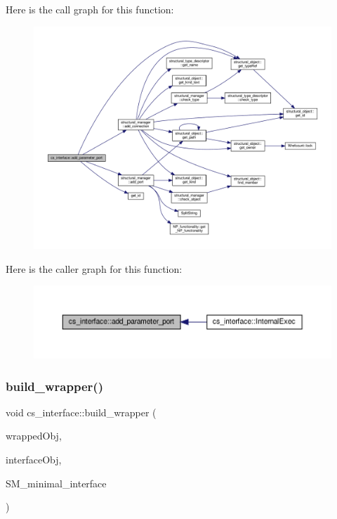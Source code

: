 Here is the call graph for this function\+:
\nopagebreak
\begin{figure}[H]
\begin{center}
\leavevmode
\includegraphics[width=350pt]{d1/dfa/classcs__interface_ab357b22ce264cfcbf7c82e74b5c7259d_cgraph}
\end{center}
\end{figure}
Here is the caller graph for this function\+:
\nopagebreak
\begin{figure}[H]
\begin{center}
\leavevmode
\includegraphics[width=350pt]{d1/dfa/classcs__interface_ab357b22ce264cfcbf7c82e74b5c7259d_icgraph}
\end{center}
\end{figure}
\mbox{\label{classcs__interface_a21c5ab8db76d61e95448213b99388792}} 
\subsubsection{\texorpdfstring{build\+\_\+wrapper()}{build\_wrapper()}}
{\footnotesize\ttfamily void cs\+\_\+interface\+::build\+\_\+wrapper (\begin{DoxyParamCaption}\item[{\hyperlink{structural__objects_8hpp_a8ea5f8cc50ab8f4c31e2751074ff60b2}{structural\+\_\+object\+Ref}}]{wrapped\+Obj,  }\item[{\hyperlink{structural__objects_8hpp_a8ea5f8cc50ab8f4c31e2751074ff60b2}{structural\+\_\+object\+Ref}}]{interface\+Obj,  }\item[{\hyperlink{structural__manager_8hpp_ab3136f0e785d8535f8d252a7b53db5b5}{structural\+\_\+manager\+Ref}}]{S\+M\+\_\+minimal\+\_\+interface }\end{DoxyParamCaption})}

